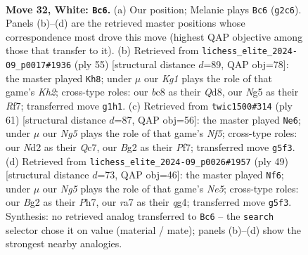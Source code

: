 \documentclass[11pt]{article}
\begin{document}
\clearpage

\begin{figure}[p]\centering
\begin{subfigure}{0.46\textwidth}\centering
\resizebox{\linewidth}{!}{%
\newchessgame
\chessboard[
  setfen={1qb5/r4pkp/5np1/6N1/P7/1p4P1/3NRPBP/R5K1 w - - 0 32},
  showmover=false,
  pgfstyle=straightmove, color=movearrow, markmove={g2-c6}
]}
\caption{}
\end{subfigure}\hfill
\begin{subfigure}{0.46\textwidth}\centering
\resizebox{\linewidth}{!}{%
\newchessgame
\chessboard[
  setfen={1r1q4/5r1k/1p5p/2pn3p/4N3/4P2P/1RQ2PP1/5RK1 b - - 1 28},
  showmover=false,
  pgfstyle=straightmove, color=movearrow, markmove={h7-h8}
]}
\caption{}
\end{subfigure}
\\[4pt]
\begin{subfigure}{0.46\textwidth}\centering
\resizebox{\linewidth}{!}{%
\newchessgame
\chessboard[
  setfen={4rk2/2q2pp1/1p5p/8/1PPQpn2/7P/3R1PP1/4N1K1 b - - 5 31},
  showmover=false,
  pgfstyle=straightmove, color=movearrow, markmove={f4-e6}
]}
\caption{}
\end{subfigure}\hfill
\begin{subfigure}{0.46\textwidth}\centering
\resizebox{\linewidth}{!}{%
\newchessgame
\chessboard[
  setfen={3rr1k1/5ppp/p7/1p6/4n1Q1/4BNP1/Pq3P1P/5RK1 b - - 1 25},
  showmover=false,
  pgfstyle=straightmove, color=movearrow, markmove={e4-f6}
]}
\caption{}
\end{subfigure}
\caption{\textbf{Move 32, White: \texttt{Bc6}.} (a) Our position; Melanie plays \texttt{Bc6} (\texttt{g2c6}). Panels (b)--(d) are the retrieved master positions whose correspondence most drove this move (highest QAP objective among those that transfer to it). (b) Retrieved from \texttt{lichess\_elite\_2024-09\_p0017\#1936} (ply 55) [structural distance $d$=89, QAP obj=78]: the master played \texttt{Kh8}; under $\mu$ our \emph{Kg1} plays the role of that game's \emph{Kh2}; cross-type roles: our \emph{b}c8 as their \emph{Q}d8, our \emph{N}g5 as their \emph{R}f7; transferred move \texttt{g1h1}. (c) Retrieved from \texttt{twic1500\#314} (ply 61) [structural distance $d$=87, QAP obj=56]: the master played \texttt{Ne6}; under $\mu$ our \emph{Ng5} plays the role of that game's \emph{Nf5}; cross-type roles: our \emph{N}d2 as their \emph{Q}c7, our \emph{B}g2 as their \emph{P}f7; transferred move \texttt{g5f3}. (d) Retrieved from \texttt{lichess\_elite\_2024-09\_p0026\#1957} (ply 49) [structural distance $d$=73, QAP obj=46]: the master played \texttt{Nf6}; under $\mu$ our \emph{Ng5} plays the role of that game's \emph{Ne5}; cross-type roles: our \emph{B}g2 as their \emph{P}h7, our \emph{r}a7 as their \emph{q}g4; transferred move \texttt{g5f3}. Synthesis: no retrieved analog transferred to \texttt{Bc6} -- the \texttt{search} selector chose it on value (material / mate); panels (b)--(d) show the strongest nearby analogies.}
\label{fig:thought-m62}
\end{figure}
\end{document}

